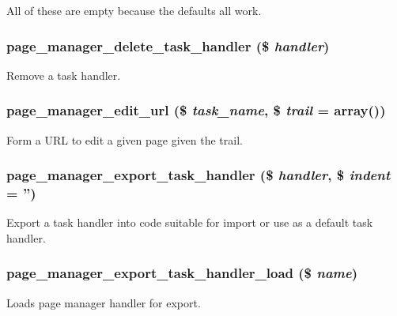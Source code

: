 All of these are empty because the defaults all work. \hypertarget{page__manager_8module_a5c48ed8479bdab84952c4ef5d98cf414}{
\subsubsection[{page\_\-manager\_\-delete\_\-task\_\-handler}]{\setlength{\rightskip}{0pt plus 5cm}page\_\-manager\_\-delete\_\-task\_\-handler (\$ {\em handler})}}
\label{page__manager_8module_a5c48ed8479bdab84952c4ef5d98cf414}
Remove a task handler. \hypertarget{page__manager_8module_ab783a148be1cb9606056ed0ccfa24d3a}{
\subsubsection[{page\_\-manager\_\-edit\_\-url}]{\setlength{\rightskip}{0pt plus 5cm}page\_\-manager\_\-edit\_\-url (\$ {\em task\_\-name}, \/  \$ {\em trail} = {\ttfamily array()})}}
\label{page__manager_8module_ab783a148be1cb9606056ed0ccfa24d3a}
Form a URL to edit a given page given the trail. \hypertarget{page__manager_8module_af83383316a7ee971b7d06aedaa2dcff8}{
\subsubsection[{page\_\-manager\_\-export\_\-task\_\-handler}]{\setlength{\rightskip}{0pt plus 5cm}page\_\-manager\_\-export\_\-task\_\-handler (\$ {\em handler}, \/  \$ {\em indent} = {\ttfamily ''})}}
\label{page__manager_8module_af83383316a7ee971b7d06aedaa2dcff8}
Export a task handler into code suitable for import or use as a default task handler. \hypertarget{page__manager_8module_aa3fa7f3e10ba755a9845afab27d4da04}{
\subsubsection[{page\_\-manager\_\-export\_\-task\_\-handler\_\-load}]{\setlength{\rightskip}{0pt plus 5cm}page\_\-manager\_\-export\_\-task\_\-handler\_\-load (\$ {\em name})}}
\label{page__manager_8module_aa3fa7f3e10ba755a9845afab27d4da04}
Loads page manager handler for export.

